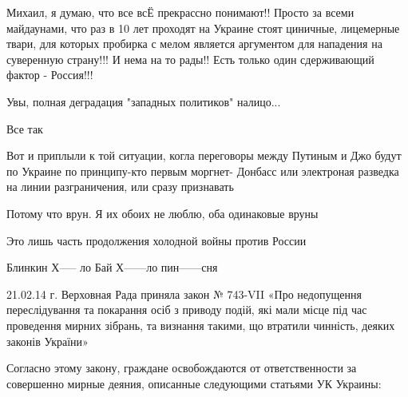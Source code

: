 \begin{itemize}

Михаил, я думаю, что все всЁ прекрассно понимают!! Просто за всеми майдаунами,
что раз в 10 лет проходят на Украине стоят циничные, лицемерные твари, для
которых пробирка с мелом является аргументом для нападения на суверенную
страну!!! И нема на то рады!! Есть только один сдерживающий фактор - Россия!!!


Увы, полная деградация "западных политиков" налицо...

Все так


Вот и приплыли к той ситуации, когла переговоры между Путиным и Джо будут по
Украине по принципу-кто первым моргнет- Донбасс или электроная разведка на
линии разграничения, или сразу признавать


Потому что врун. Я их обоих не люблю, оба одинаковые вруны

Это лишь часть продолжения холодной войны против России

Блинкин Х----- ло Бай Х------ло пин------сня


21.02.14 г. Верховная Рада приняла закон № 743-VII «Про недопущення
переслідування та покарання осіб з приводу подій, які мали місце під час
проведення мирних зібрань, та визнання такими, що втратили чинність, деяких
законів України»

Согласно этому закону, граждане освобождаются от ответственности за совершенно
мирные деяния, описанные следующими статьями УК Украины:


\end{itemize}
